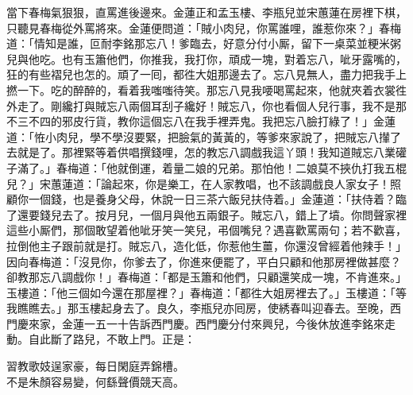 當下春梅氣狠狠，直罵進後邊來。金蓮正和孟玉樓、李瓶兒並宋蕙蓮在房裡下棋，只聽見春梅從外罵將來。金蓮便問道：「賊小肉兒，你罵誰哩，誰惹你來？」春梅道：「情知是誰，叵耐李銘那忘八！爹臨去，好意分付小厮，留下一桌菜並粳米粥兒與他吃。也有玉簫他們，你推我，我打你，頑成一塊，對着忘八，呲牙露嘴的，狂的有些褶兒也怎的。頑了一囘，都徃大姐那邊去了。忘八見無人，盡力把我手上撚一下。吃的醉醉的，看着我嗤嗤待笑。{}那忘八見我喓喝罵起來，他就夾着衣裳徃外走了。剛纔打與賊忘八兩個耳刮子纔好！賊忘八，你也看個人兒行事，我不是那不三不四的邪皮行貨，教你這個忘八在我手裡弄鬼。我把忘八臉打綠了！」金蓮道：「恠小肉兒，學不學沒要緊，把臉氣的黃黃的，等爹來家說了，把賊忘八攆了去就是了。那裡緊等着供唱撰錢哩，{}怎的教忘八調戲我這丫頭！我知道賊忘八業礶子滿了。」春梅道：「他就倒運，着量二娘的兄弟。{}那怕他！二娘莫不挾仇打我五棍兒？」宋蕙蓮道：「論起來，你是樂工，在人家教唱，也不該調戲良人家女子！照顧你一個錢，也是養身父母，休說一日三茶六飯兒扶侍着。」金蓮道：「扶侍着？臨了還要錢兒去了。按月兒，一個月與他五兩銀子。賊忘八，錯上了墳。你問聲家裡這些小厮們，那個敢望着他呲牙笑一笑兒，弔個嘴兒？遇喜歡罵兩句；若不歡喜，拉倒他主子跟前就是打。賊忘八，造化低，你惹他生薑，你還沒曾經着他辣手！」{}因向春梅道：「沒見你，你爹去了，你進來便罷了，平白只顧和他那房裡做甚麼？卻教那忘八調戲你！」春梅道：「都是玉簫和他們，只顧還笑成一塊，不肯進來。」玉樓道：「他三個如今還在那屋裡？」春梅道：「都徃大姐房裡去了。」玉樓道：「等我瞧瞧去。」那玉樓起身去了。良久，李瓶兒亦囘房，使綉春叫迎春去。至晚，西門慶來家，金蓮一五一十告訴西門慶。西門慶分付來興兒，今後休放進李銘來走動。自此斷了路兒，不敢上門。正是：

\begin{myquote} 
習教歌妓逞家豪，每日閑庭弄錦槽。\\不是朱顏容易變，何繇聲價競天高。
\end{myquote} 

